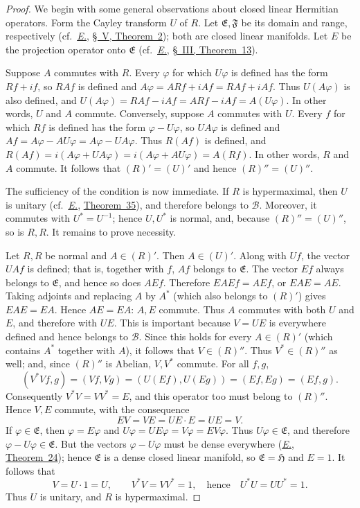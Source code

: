\documentclass[
  paper=b5,
  twoside=true,
  fontsize=13pt,
  headings=normal,
  bookmarkpackage=false
]{scrartcl}
\theoremstyle{definition}
\newcommand{\Eref}{\hyperref[fn:E-paper]{\emph{E.}}}
\newcommand{\ErefText}[1]{\href{https://doi.org/10.1007/BF01782338}{#1}}
\begin{document}
\begin{proof}
We begin with some general observations about closed linear Hermitian
operators.  Form the Cayley transform \(U\) of \(R\).  Let
\(\mathfrak E,\mathfrak F\) be its domain and range, respectively
(cf.\ \Eref, \ErefText{\S~V, Theorem~2}); both are closed linear manifolds.
Let \(E\) be the projection operator onto \(\mathfrak E\)
(cf.\ \Eref, \ErefText{\S~III, Theorem~13}).

Suppose \(A\) commutes with \(R\). Every \(\varphi\) for which
\(U\varphi\) is defined has the form \(Rf+if\), so \(RAf\) is defined
and \(A\varphi=ARf+iAf=RAf+iAf\). Thus \(U(A\varphi)\) is also
defined, and \(U(A\varphi)=RAf-iAf=ARf-iAf=A(U\varphi)\).
In other words, \(U\) and \(A\) commute. Conversely, suppose \(A\)
commutes with \(U\). Every \(f\) for which \(Rf\) is defined has the
form \(\varphi-U\varphi\), so \(UA\varphi\) is defined and
\(Af=A\varphi-AU\varphi=A\varphi-UA\varphi\). Thus \(R(Af)\) is
defined, and
\(R(Af)=i(A\varphi+UA\varphi)=i(A\varphi+AU\varphi)=A(Rf)\).
In other words, \(R\) and \(A\) commute. It follows that \((R)'=(U)'\)
and hence \((R)''=(U)''\).

The sufficiency of the condition is now immediate.  If \(R\) is
hypermaximal, then \(U\) is unitary (cf.\ \Eref, \ErefText{Theorem~35}), and
therefore belongs to \(\mathcal B\).  Moreover, it commutes with
\(U^*=U^{-1}\); hence \(U,U^*\) is normal, and, because
\((R)''=(U)''\), so is \(R,R\). It remains to prove necessity.

Let \(R,R\) be normal and \(A\in(R)'\).  Then \(A\in(U)'\).  Along with \(Uf\), the vector \(UAf\)
is defined; that is, together with \(f\), \(Af\) belongs to
\(\mathfrak E\).  The vector \(Ef\) always belongs to \(\mathfrak E\),
and hence so does \(AEf\). Therefore \(EAEf=AEf\), or \(EAE=AE\).
Taking adjoints and replacing \(A\) by \(A^*\) (which also belongs to
\((R)'\)) gives \(EAE=EA\).  Hence \(AE=EA\): \(A,E\) commute.  Thus
\(A\) commutes with both \(U\) and \(E\), and therefore with \(UE\). This is important because \(V=UE\)
is everywhere defined and hence belongs
to \(\mathcal B\).  Since this holds for every \(A\in(R)'\) (which
contains \(A^*\) together with \(A\)), it follows that \(V\in(R)''\).
Thus \(V^*\in(R)''\) as well; and, since \((R)''\) is Abelian,
\(V,V^*\) commute.  For all \(f,g\),
\[
  (V^*Vf,g)=(Vf,Vg)=(U(Ef),U(Eg))=(Ef,Eg)=(Ef,g).
\]
Consequently \(V^*V=VV^*=E\), and this operator too must belong to \((R)''\).  Hence \(V,E\) commute,
with the consequence
\[
  EV=VE=UE\cdot E=UE=V.
\]
If \(\varphi\in\mathfrak E\), then \(\varphi=E\varphi\) and
\(U\varphi=UE\varphi=V\varphi=EV\varphi\). Thus \(U\varphi\in\mathfrak E\), and therefore
\(\varphi-U\varphi\in\mathfrak E\).  But the vectors
\(\varphi-U\varphi\) must be dense everywhere (\Eref, \ErefText{Theorem~24});
hence \(\mathfrak E\) is a dense closed linear manifold, so
\(\mathfrak E=\mathfrak H\) and \(E=1\). It follows that
\[
  V=U\cdot1=U,\qquad V^*V=VV^*=1,\quad
  \text{hence}\quad U^*U=UU^*=1.
\]
Thus \(U\) is unitary, and \(R\) is hypermaximal.
\end{proof}
\end{document}

